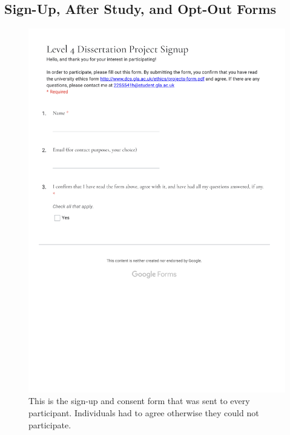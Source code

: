 \documentclass{l4proj}
\begin{document}
\begin{appendices}
\chapter{Sign-Up, After Study, and Opt-Out Forms}
\begin{figure}[htb]
    \includegraphics[width=\linewidth]{images/signup_form.pdf}
    \caption{This is the sign-up and consent form that was sent to every participant. Individuals had to agree otherwise they could not participate.}
    \label{fig:consent_form} 
\end{figure}


\end{appendices}
\end{document}
